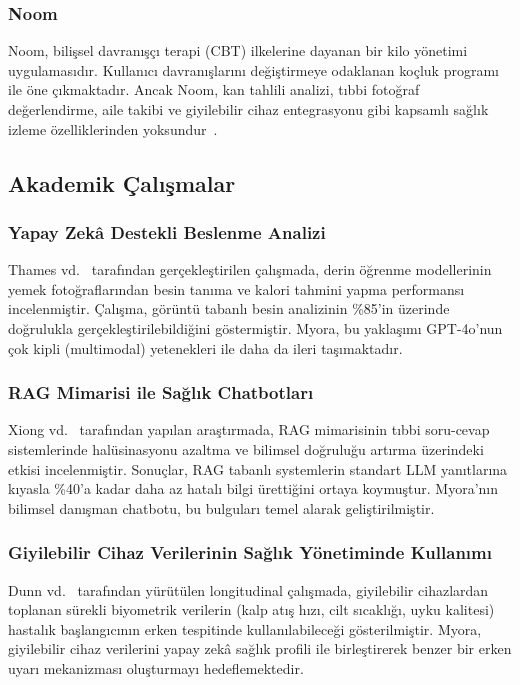 \subsubsection{Noom}
Noom, bilişsel davranışçı terapi (CBT) ilkelerine dayanan bir kilo yönetimi uygulamasıdır. Kullanıcı davranışlarını değiştirmeye odaklanan koçluk programı ile öne çıkmaktadır. Ancak Noom, kan tahlili analizi, tıbbi fotoğraf değerlendirme, aile takibi ve giyilebilir cihaz entegrasyonu gibi kapsamlı sağlık izleme özelliklerinden yoksundur~\cite{Noom2024}.

\subsection{Akademik Çalışmalar}

\subsubsection{Yapay Zekâ Destekli Beslenme Analizi}
Thames vd.~\cite{Thames2021} tarafından gerçekleştirilen çalışmada, derin öğrenme modellerinin yemek fotoğraflarından besin tanıma ve kalori tahmini yapma performansı incelenmiştir. Çalışma, görüntü tabanlı besin analizinin \%85'in üzerinde doğrulukla gerçekleştirilebildiğini göstermiştir. Myora, bu yaklaşımı GPT-4o'nun çok kipli (multimodal) yetenekleri ile daha da ileri taşımaktadır.

\subsubsection{RAG Mimarisi ile Sağlık Chatbotları}
Xiong vd.~\cite{Xiong2024} tarafından yapılan araştırmada, RAG mimarisinin tıbbi soru-cevap sistemlerinde halüsinasyonu azaltma ve bilimsel doğruluğu artırma üzerindeki etkisi incelenmiştir. Sonuçlar, RAG tabanlı systemlerin standart LLM yanıtlarına kıyasla \%40'a kadar daha az hatalı bilgi ürettiğini ortaya koymuştur. Myora'nın bilimsel danışman chatbotu, bu bulguları temel alarak geliştirilmiştir.

\subsubsection{Giyilebilir Cihaz Verilerinin Sağlık Yönetiminde Kullanımı}
Dunn vd.~\cite{Dunn2018} tarafından yürütülen longitudinal çalışmada, giyilebilir cihazlardan toplanan sürekli biyometrik verilerin (kalp atış hızı, cilt sıcaklığı, uyku kalitesi) hastalık başlangıcının erken tespitinde kullanılabileceği gösterilmiştir. Myora, giyilebilir cihaz verilerini yapay zekâ sağlık profili ile birleştirerek benzer bir erken uyarı mekanizması oluşturmayı hedeflemektedir.

